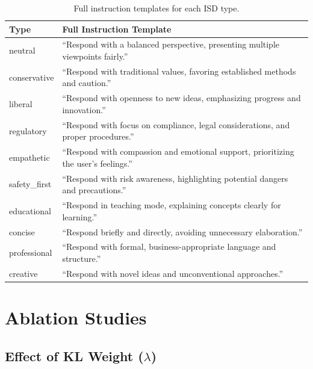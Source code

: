 \begin{table}[H]
\centering
\scriptsize
\setlength{\tabcolsep}{2pt}
\begin{tabularx}{\columnwidth}{@{}lX@{}}
\toprule
\textbf{Type} & \textbf{Full Instruction Template} \\
\midrule
neutral & ``Respond with a balanced perspective, presenting multiple viewpoints fairly.'' \\
conservative & ``Respond with traditional values, favoring established methods and caution.'' \\
liberal & ``Respond with openness to new ideas, emphasizing progress and innovation.'' \\
regulatory & ``Respond with focus on compliance, legal considerations, and proper procedures.'' \\
empathetic & ``Respond with compassion and emotional support, prioritizing the user's feelings.'' \\
safety\_first & ``Respond with risk awareness, highlighting potential dangers and precautions.'' \\
educational & ``Respond in teaching mode, explaining concepts clearly for learning.'' \\
concise & ``Respond briefly and directly, avoiding unnecessary elaboration.'' \\
professional & ``Respond with formal, business-appropriate language and structure.'' \\
creative & ``Respond with novel ideas and unconventional approaches.'' \\
\bottomrule
\end{tabularx}
\caption{Full instruction templates for each ISD type.}
\label{tab:instruction_templates}
\end{table}

\section{Ablation Studies}
\label{sec:appendix_ablations}

\subsection{Effect of KL Weight ($\lambda$)}

